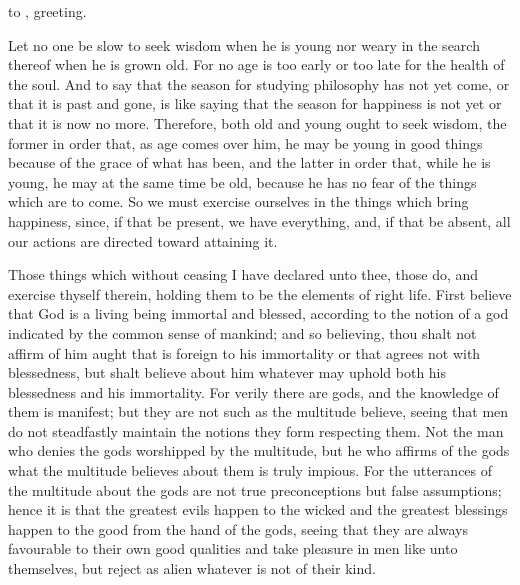 \documentclass{stex}
\begin{document}

\noindent {} to , greeting.

\vspace{1em}
Let no one be slow to seek wisdom when he is young nor weary in the search thereof when he is grown old.
For no age is too early or too late for the health of the soul.
And to say that the season for studying philosophy has not yet come, or that it is past and gone, is like saying that the season for happiness is not yet or that it is now no more.
Therefore, both old and young ought to seek wisdom, the former in order that, as age comes over him, he may be young in good things because of the grace of what has been, and the latter in order that, while he is young, he may at the same time be old, because he has no fear of the things which are to come.
So we must exercise ourselves in the things which bring happiness, since, if that be present, we have everything, and, if that be absent, all our actions are directed toward attaining it.

Those things which without ceasing I have declared unto thee, those do, and exercise thyself therein, holding them to be the elements of right life.
First believe that God is a living being immortal and blessed, according to the notion of a god indicated by the common sense of mankind; and so believing, thou shalt not affirm of him aught that is foreign to his immortality or that agrees not with blessedness, but shalt believe about him whatever may uphold both his blessedness and his immortality.
For verily there are gods, and the knowledge of them is manifest; but they are not such as the multitude believe, seeing that men do not steadfastly maintain the notions they form respecting them.
Not the man who denies the gods worshipped by the multitude, but he who affirms of the gods what the multitude believes about them is truly impious.
For the utterances of the multitude about the gods are not true preconceptions but false assumptions; hence it is that the greatest evils happen to the wicked and the greatest blessings happen to the good from the hand of the gods, seeing that they are always favourable to their own good qualities and take pleasure in men like unto themselves, but reject as alien whatever is not of their kind.
\end{document}
